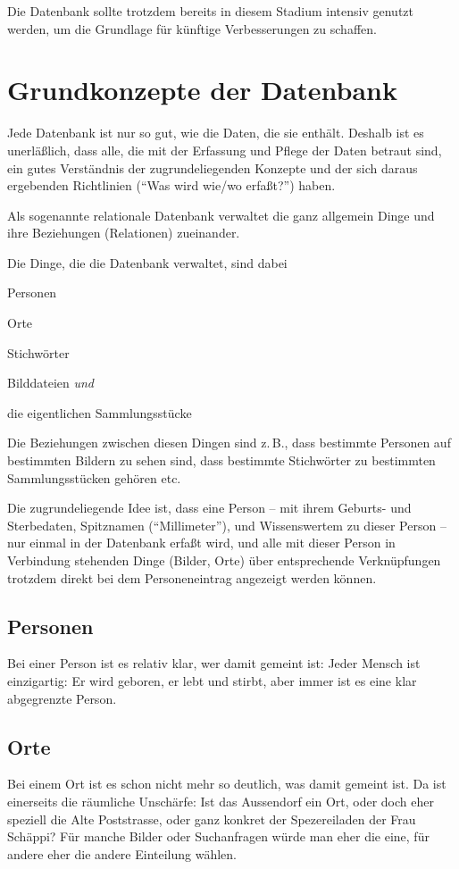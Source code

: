 \documentclass[12pt]{scrreprt}
\begin{document}
Die Datenbank sollte trotzdem bereits in diesem Stadium intensiv
genutzt werden, um die Grundlage für künftige Verbesserungen zu
schaffen.

\chapter{Grundkonzepte der Datenbank}

Jede Datenbank ist nur so gut, wie die Daten, die sie enthält.
Deshalb ist es unerläßlich, dass alle, die mit der Erfassung und
Pflege der Daten betraut sind, ein gutes Verständnis der
zugrundeliegenden Konzepte und der sich daraus ergebenden Richtlinien
(``Was wird wie/wo erfaßt?'')  haben.

Als sogenannte relationale Datenbank verwaltet die \DB{} ganz allgemein Dinge und
ihre Beziehungen (Relationen) zueinander.

Die Dinge, die die Datenbank verwaltet, sind dabei
\begin{citemize}
\item Personen
\item Orte
\item Stichwörter
\item Bilddateien \textit{und}
\item die eigentlichen Sammlungsstücke
\end{citemize}

Die Beziehungen zwischen diesen Dingen sind z.\,B., dass bestimmte
Personen auf bestimmten Bildern zu sehen sind, dass bestimmte Stichwörter
zu bestimmten Sammlungsstücken gehören etc.

Die zugrundeliegende Idee ist, dass eine Person -- mit ihrem Geburts- und Sterbedaten,
Spitznamen (``Millimeter''), und Wissenswertem zu dieser Person -- nur
einmal in der Datenbank erfaßt wird, und alle mit dieser Person in Verbindung
stehenden Dinge (Bilder, Orte) über entsprechende Verknüpfungen trotzdem direkt
bei dem Personeneintrag angezeigt werden können.

\section{Personen} Bei einer Person ist es relativ klar, wer damit gemeint ist:
Jeder Mensch ist einzigartig: Er wird geboren, er lebt und stirbt, aber immer ist
es eine klar abgegrenzte Person.

\section{Orte} Bei einem Ort ist es schon nicht mehr so deutlich, was damit gemeint ist.
Da ist einerseits die räumliche Unschärfe: Ist das Aussendorf ein Ort, oder doch
eher speziell die Alte Poststrasse, oder ganz konkret der Spezereiladen der Frau Schäppi?
Für manche Bilder oder Suchanfragen würde man eher die eine, für andere eher die andere
Einteilung wählen. 
\end{document}
